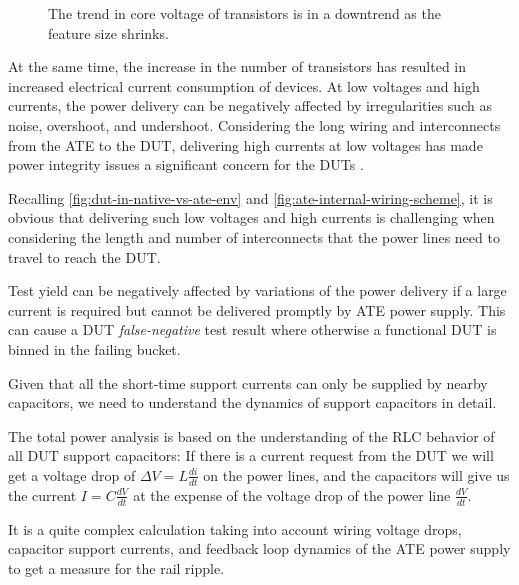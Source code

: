\begin{figure}[h!]
    \centering

    \caption[Feature Size v.s. Core Voltage]{
        The trend in core voltage of transistors is in a
        downtrend as the feature size shrinks.
    }
    \label{fig:featsize-vs-corevolt}
    \vspace{-0.8\baselineskip}
\end{figure}

At the same time, the increase in the number of transistors has resulted in
increased electrical current consumption of devices.
At low voltages and high currents, the power delivery can be negatively affected
by irregularities such as noise, overshoot, and undershoot.
Considering the long wiring and interconnects from the \ac{ATE} to the \ac{DUT},
delivering high currents at low voltages has made power integrity issues
a significant concern for the \acp{DUT} \autocite{Arabi}.

Recalling \autoref{fig:dut-in-native-vs-ate-env} and
\autoref{fig:ate-internal-wiring-scheme}, it is obvious that delivering such
low voltages and high currents is challenging when considering the
length and number of interconnects that the power lines need to travel to reach
the \ac{DUT}.

\enlargethispage{2\baselineskip}
Test yield can be negatively affected by variations of the power delivery
if a large current is required but cannot
be delivered promptly by \ac{ATE} power supply.
This can cause a \ac{DUT} \emph{false-negative} test result where otherwise a
functional \ac{DUT} is binned in the failing bucket.


Given that all the short-time support currents can only be supplied by
nearby capacitors, we need to understand the dynamics of support capacitors
in detail.

The total power analysis is based on the understanding of the \ac{RLC} behavior of
all DUT support capacitors: If there is a current request from the DUT we will
get a voltage drop of $\Delta V = L \frac{di}{dt}$ on the power lines, and the
capacitors will give us the current $I = C \frac{dV}{dt}$ at the expense of
the voltage drop of the power line $\frac{dV}{dt}$.

It is a quite complex calculation taking into account wiring voltage drops,
capacitor support currents, and feedback loop dynamics of
the \ac{ATE} power supply to get a measure for the rail ripple.

\newpage
